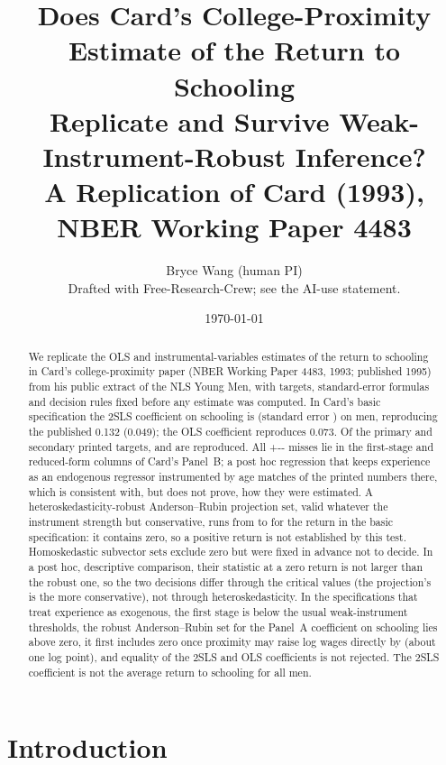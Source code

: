 \documentclass[11pt]{article}
\title{Does Card's College-Proximity Estimate of the Return to Schooling\\
Replicate and Survive Weak-Instrument-Robust Inference?\\[4pt]
\large A Replication of Card (1993), NBER Working Paper 4483}
\author{Bryce Wang (human PI) \\ \small Drafted with Free-Research-Crew; see the AI-use statement.}
\date{\today}
\newcommand{\HOneMisses}{\the\numexpr\HOnePrimaryTargets+\HOneSecondaryTargets-\HOnePrimaryReproduced-\HOneSecondaryReproduced\relax}
\begin{document}
\maketitle

\begin{abstract}
\noindent
We replicate the OLS and instrumental-variables estimates of the return to schooling in
Card's college-proximity paper (NBER Working Paper 4483, 1993; published 1995) from his
public extract of the NLS Young Men, with targets, standard-error formulas and decision
rules fixed before any estimate was computed. In Card's basic specification the 2SLS
coefficient on schooling is \IvReturn{} (standard error \IvReturnSe{}) on \NSample{} men,
reproducing the published 0.132 (0.049); the OLS coefficient \OlsReturn{} reproduces 0.073. %
Of the \HOnePrimaryTargets{} primary and \HOneSecondaryTargets{} secondary printed targets,
\HOnePrimaryReproduced{} and \HOneSecondaryReproduced{} are reproduced. All \HOneMisses{}
misses lie in the first-stage and reduced-form columns of Card's Panel~B; a post hoc
regression that keeps experience as an endogenous regressor instrumented by age matches
\DiagTargetsReproduced{} of the \DiagTargets{} printed numbers there, which is consistent
with, but does not prove, how they were estimated. A heteroskedasticity-robust
Anderson--Rubin projection set, valid whatever the instrument strength but conservative,
runs from \BSixArRobLo{} to \BSixArRobHi{} for the return in the basic specification: it
contains zero, so a positive return is not established by this test. Homoskedastic
subvector sets exclude zero but were fixed in advance not to decide. In a post hoc,
descriptive comparison, their statistic at a zero return is not larger than the robust one, so the two decisions differ through the
critical values (the projection's is the more conservative), not through
heteroskedasticity. In the specifications that treat experience as exogenous, the
first stage is below the usual weak-instrument thresholds, the robust Anderson--Rubin set
for the Panel~A coefficient on schooling lies above zero, it first includes zero once
proximity may raise log wages directly by \ASixPacoefChrBreakdown{} (about one log point),
and equality of the 2SLS and OLS coefficients is not rejected. The 2SLS coefficient is not
the average return to schooling for all men.
\end{abstract}

\section{Introduction}
\label{sec:intro}
\end{document}
